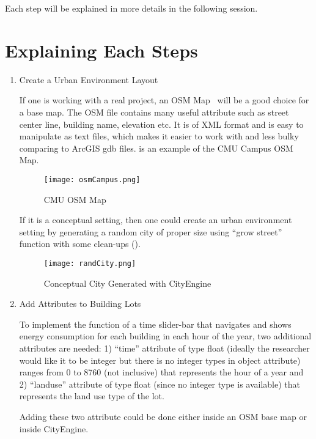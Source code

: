 Each step will be explained in more details in the following session.
\section{Explaining Each Steps}
\begin{enumerate}[1)]
\item{Create a Urban Environment Layout}

  If one is working with a real project, an OSM Map~\cite{OSM2015}
  will be a good choice for a base map. The OSM file contains many
  useful attribute such as street center line, building name,
  elevation etc. It is of XML format and is easy to manipulate as text
  files, which makes it easier to work with and less bulky comparing
  to ArcGIS gdb files.  is an example of the CMU
  Campus OSM Map.

  \begin{figure}[h!]
    \centering
    \texttt{[image: osmCampus.png]}
    \caption[CMU OSM Map]{CMU OSM Map~\cite{OSM2015}}
    \label{fig:osmCampus}
  \end{figure}

  If it is a conceptual setting, then one could create an urban
  environment setting by generating a random city of proper size using
  ``grow street'' function with some clean-ups ().

  \begin{figure}[h!]
    \centering
    \texttt{[image: randCity.png]}
    \caption[Conceptual City Lots]{Conceptual City Generated with
      CityEngine}
    \label{fig:randCity}
  \end{figure}

\item{Add Attributes to Building Lots} 

  To implement the function of a time slider-bar that navigates and
  shows energy consumption for each building in each hour of the year,
  two additional attributes are needed: 1) ``time'' attribute of type
  float (ideally the researcher would like it to be integer but there is no
  integer types in object attribute) ranges from 0 to 8760 (not
  inclusive) that represents the hour of a year and 2) ``landuse''
  attribute of type float (since no integer type is available) that
  represents the land use type of the lot.

  Adding these two attribute could be done either inside an OSM base
  map or inside CityEngine.


\end{enumerate}
